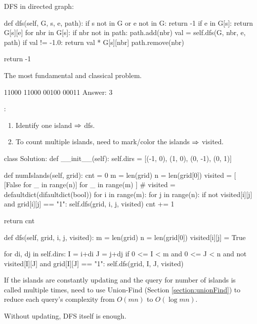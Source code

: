  DFS in directed graph:
\begin{python}
def dfs(self, G, s, e, path):
    if s not in G or e not in G:
        return -1
    if e in G[s]:
        return G[s][e]
    for nbr in G[s]:
        if nbr not in path:
            path.add(nbr)
            val = self.dfs(G, nbr, e, path)
            if val != -1.0:
                return val * G[s][nbr]
            path.remove(nbr)

    return -1
\end{python}

 The most fundamental and classical problem.
\begin{python}
11000
11000
00100
00011
Answer: 3
\end{python}
:
\begin{enumerate}
\item Identify one island $\Rightarrow$ dfs. 
\item To count multiple islands, need to mark/color the islands $\Rightarrow$ visited.
\end{enumerate}
\begin{python}
class Solution:
  def __init__(self):
    self.dirs = [(-1, 0), (1, 0), (0, -1), (0, 1)]

  def numIslands(self, grid):
    cnt = 0
    m = len(grid)
    n = len(grid[0])
    visited = [
      [False for _ in range(n)]
      for _ in range(m)
    ]
    # visited = defaultdict(difaultdict(bool))
    for i in range(m):
      for j in range(n):
        if not visited[i][j] and grid[i][j] == "1":
          self.dfs(grid, i, j, visited)
          cnt += 1

    return cnt
\end{python}

\begin{python}
  def dfs(self, grid, i, j, visited):
    m = len(grid)
    n = len(grid[0])
    visited[i][j] = True

    for di, dj in self.dirs:
      I = i+di
      J = j+dj
      if 0 <= I < m and 0 <= J < n
        and not visited[I][J]
        and grid[I][J] == "1":
        self.dfs(grid, I, J, visited)
\end{python}
If the islands are constantly updating and the query for number of islands is called multiple times, need to use Union-Find (Section \ref{section:unionFind}) to reduce each query's complexity from $O(mn)$ to $O(\log mn)$.

Without updating, DFS itself is enough.


